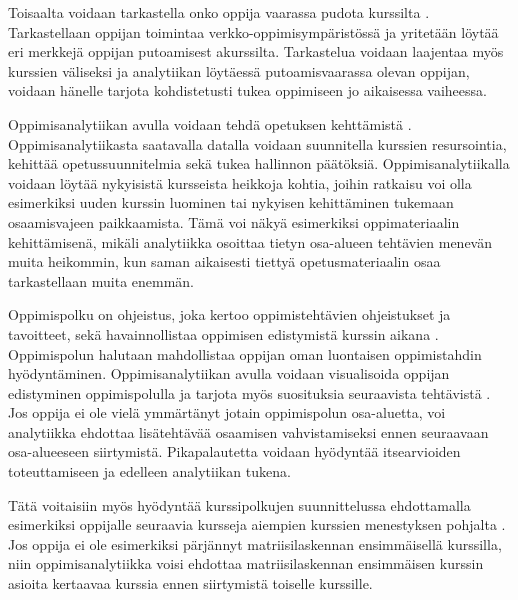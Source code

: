 Toisaalta voidaan tarkastella onko oppija vaarassa pudota kurssilta \citep{oliveSupervisedLearningFramework2018, suhonenUsingMoodleData2019}. Tarkastellaan oppijan toimintaa verkko-oppimisympäristössä ja yritetään löytää eri merkkejä oppijan putoamisest akurssilta. Tarkastelua voidaan laajentaa myös kurssien väliseksi \citep{kinnari-korpelaOppimisanalytiikallaTehokkaampaanOhjaukseen2020} ja analytiikan löytäessä putoamisvaarassa olevan oppijan, voidaan hänelle tarjota kohdistetusti tukea oppimiseen jo aikaisessa vaiheessa.

Oppimisanalytiikan avulla voidaan tehdä opetuksen kehttämistä \citep{romeroEducationalDataMining2010}. Oppimisanalytiikasta saatavalla datalla voidaan suunnitella kurssien resursointia, kehittää opetussuunnitelmia sekä tukea hallinnon päätöksiä. Oppimisanalytiikalla voidaan löytää nykyisistä kursseista heikkoja kohtia, joihin ratkaisu voi olla esimerkiksi uuden kurssin luominen tai nykyisen kehittäminen tukemaan osaamisvajeen paikkaamista. Tämä voi näkyä esimerkiksi oppimateriaalin kehittämisenä, mikäli analytiikka osoittaa tietyn osa-alueen tehtävien menevän muita heikommin, kun saman aikaisesti tiettyä opetusmateriaalin osaa tarkastellaan muita enemmän.

Oppimispolku on ohjeistus, joka kertoo oppimistehtävien ohjeistukset ja tavoitteet, sekä havainnollistaa oppimisen edistymistä kurssin aikana \citep{toivolaFlippedLearningKaanteinen2017}. Oppimispolun halutaan mahdollistaa oppijan oman luontaisen oppimistahdin hyödyntäminen. Oppimisanalytiikan avulla voidaan visualisoida oppijan edistyminen oppimispolulla ja tarjota myös suosituksia seuraavista tehtävistä \citep{longPenetratingFogAnalytics2011}. Jos oppija ei ole vielä ymmärtänyt jotain oppimispolun osa-aluetta, voi analytiikka ehdottaa lisätehtävää osaamisen vahvistamiseksi ennen seuraavaan osa-alueeseen siirtymistä. Pikapalautetta voidaan hyödyntää itsearvioiden toteuttamiseen ja edelleen analytiikan tukena.

Tätä voitaisiin myös hyödyntää kurssipolkujen suunnittelussa ehdottamalla esimerkiksi oppijalle seuraavia kursseja aiempien kurssien menestyksen pohjalta \citep{longPenetratingFogAnalytics2011}. Jos oppija ei ole esimerkiksi pärjännyt matriisilaskennan ensimmäisellä kurssilla, niin oppimisanalytiikka voisi ehdottaa matriisilaskennan ensimmäisen kurssin asioita kertaavaa kurssia ennen siirtymistä toiselle kurssille.
